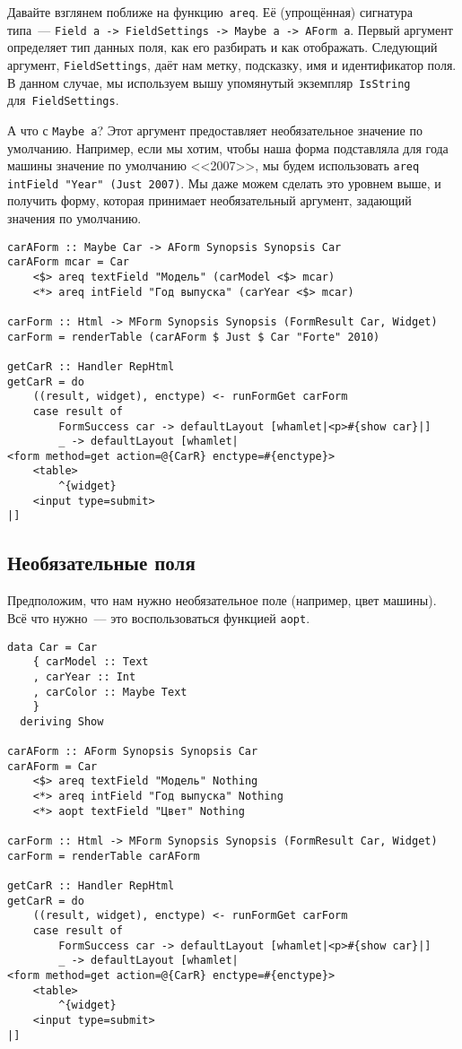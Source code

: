 Давайте взглянем поближе на функцию~\lstinline'areq'. Её (упрощённая)
сигнатура типа~--- \lstinline'Field a -> FieldSettings -> Maybe a -> AForm a'.
Первый аргумент определяет тип данных поля, как его разбирать и как
отображать.  Следующий аргумент, \lstinline'FieldSettings', даёт нам метку,
подсказку, имя и идентификатор поля. В данном случае, мы используем вышу
упомянутый экземпляр~\lstinline'IsString' для~\lstinline'FieldSettings'.

А что с \lstinline'Maybe a'? Этот аргумент предоставляет необязательное
значение по умолчанию.  Например, если мы хотим, чтобы наша форма подставляла
для года машины значение по умолчанию <<2007>>, мы будем использовать
\lstinline'areq intField "Year" (Just 2007)'. Мы даже можем сделать это
уровнем выше, и получить форму, которая принимает необязательный аргумент,
задающий значения по умолчанию.

\begin{lstlisting}[caption={Формы со значениями по умолчанию}]
carAForm :: Maybe Car -> AForm Synopsis Synopsis Car
carAForm mcar = Car
    <$> areq textField "Модель" (carModel <$> mcar)
    <*> areq intField "Год выпуска" (carYear <$> mcar)

carForm :: Html -> MForm Synopsis Synopsis (FormResult Car, Widget)
carForm = renderTable (carAForm $ Just $ Car "Forte" 2010)

getCarR :: Handler RepHtml
getCarR = do
    ((result, widget), enctype) <- runFormGet carForm
    case result of
        FormSuccess car -> defaultLayout [whamlet|<p>#{show car}|]
        _ -> defaultLayout [whamlet|
<form method=get action=@{CarR} enctype=#{enctype}>
    <table>
        ^{widget}
    <input type=submit>
|]
\end{lstlisting}

\subsection{Необязательные поля}
Предположим, что нам нужно необязательное поле (например, цвет машины). Всё
что нужно~--- это воспользоваться функцией \lstinline'aopt'.

\begin{lstlisting}[caption={Необязательные поля}]
data Car = Car
    { carModel :: Text
    , carYear :: Int
    , carColor :: Maybe Text
    }
  deriving Show

carAForm :: AForm Synopsis Synopsis Car
carAForm = Car
    <$> areq textField "Модель" Nothing
    <*> areq intField "Год выпуска" Nothing
    <*> aopt textField "Цвет" Nothing

carForm :: Html -> MForm Synopsis Synopsis (FormResult Car, Widget)
carForm = renderTable carAForm

getCarR :: Handler RepHtml
getCarR = do
    ((result, widget), enctype) <- runFormGet carForm
    case result of
        FormSuccess car -> defaultLayout [whamlet|<p>#{show car}|]
        _ -> defaultLayout [whamlet|
<form method=get action=@{CarR} enctype=#{enctype}>
    <table>
        ^{widget}
    <input type=submit>
|]
\end{lstlisting}

